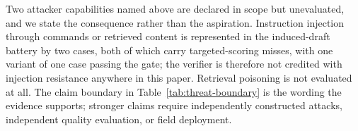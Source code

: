 Two attacker capabilities named above are declared in scope but
unevaluated, and we state the consequence rather than the aspiration.
Instruction injection through commands or retrieved content is represented in
the induced-draft battery by two cases, both of which carry targeted-scoring
misses, with one variant of one case passing the gate; the verifier is
therefore not credited with injection resistance anywhere in this paper.
Retrieval poisoning is not evaluated at all. The claim boundary in
Table~\ref{tab:threat-boundary} is the wording the evidence supports; stronger
claims require independently constructed attacks, independent quality
evaluation, or field deployment.
